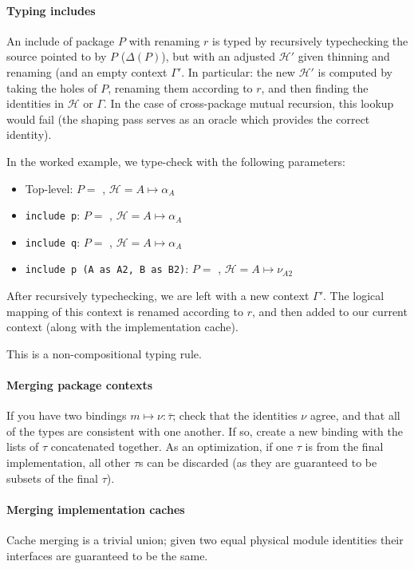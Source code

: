 \documentclass{article}
\begin{document}
\paragraph{Typing includes}

An include of package $P$ with renaming $r$ is typed by recursively typechecking the
source pointed to by $P$ ($\Delta(P)$), but with an adjusted
$\mathcal{H}'$ given thinning and renaming (and an empty context $\Gamma'$.  In particular: the new
$\mathcal{H}'$ is computed by taking the holes of $P$,
renaming them according to $r$, and then finding the identities in
$\mathcal{H}$ or $\Gamma$.  In the case of cross-package mutual recursion, this
lookup would fail (the shaping pass serves as an oracle which provides the
correct identity).

In the worked example, we type-check with the following parameters:

\begin{itemize}
    \item Top-level: $P=$ , $\mathcal{H}=A\mapsto\alpha_A$
    \item \verb|include p|: $P=$ , $\mathcal{H}=A\mapsto\alpha_A$
    \item \verb|include q|: $P=$ , $\mathcal{H}=A\mapsto\alpha_A$
    \item \verb|include p (A as A2, B as B2)|: $P=$ , $\mathcal{H}=A\mapsto\nu_{A2}$

\end{itemize}

After recursively typechecking, we are left with a new context $\Gamma'$.  The
logical mapping of this context is renamed according to $r$, and then added to
our current context (along with the implementation cache).

This is a non-compositional typing rule.

\paragraph{Merging package contexts} If you have two bindings $m \mapsto \nu:\overline{\tau}$;
check that the identities $\nu$ agree, and that all of the types are consistent with one another. If so, create a new binding with the lists of $\tau$
concatenated together. As an optimization, if one $\tau$ is from the final implementation, all other $\tau$s can be discarded (as they are guaranteed to be subsets of the final $\tau$).

\paragraph{Merging implementation caches} Cache merging is a trivial union; given
two equal physical module identities their interfaces are guaranteed to be the same.
\end{document}
